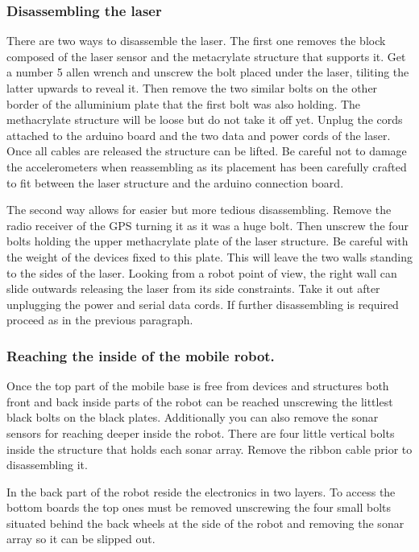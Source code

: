\subsubsection{Disassembling the laser}
\label{sec:disassembling_laser}
There are two ways to disassemble the laser. The first one removes the block composed of the laser sensor and the metacrylate structure that supports it. Get a number 5 allen wrench and unscrew the bolt placed under the laser, tiliting the latter upwards to reveal it. Then remove the two similar bolts on the other border of the alluminium plate that the first bolt was also holding. The methacrylate structure will be loose but do not take it off yet. Unplug the cords attached to the arduino board and the two data and power cords of the laser. Once all cables are released the structure can be lifted. Be careful not to damage the accelerometers when reassembling as its placement has been carefully crafted to fit between the laser structure and the arduino connection board. 

The second way allows for easier but more tedious disassembling. Remove the radio receiver of the GPS turning it as it was a huge bolt. Then unscrew the four bolts holding the upper methacrylate plate of the laser structure. Be careful with the weight of the devices fixed to this plate. This will leave the two walls standing to the sides of the laser. Looking from a robot point of view, the right wall can slide outwards releasing the laser from its side constraints. Take it out after unplugging the power and serial data cords. If further disassembling is required proceed as in the previous paragraph.

\subsubsection{Reaching the inside of the mobile robot.}
Once the top part of the mobile base is free from devices and structures both front and back inside parts of the robot can be reached unscrewing the littlest black bolts on the black plates. Additionally you can also remove the sonar sensors for reaching deeper inside the robot. There are four little vertical bolts inside the structure that holds each sonar array. Remove the ribbon cable prior to disassembling it.

In the back part of the robot reside the electronics in two layers. To access the bottom boards the top ones must be removed unscrewing the four small bolts situated behind the back wheels at the side of the robot and removing the sonar array so it can be slipped out.

